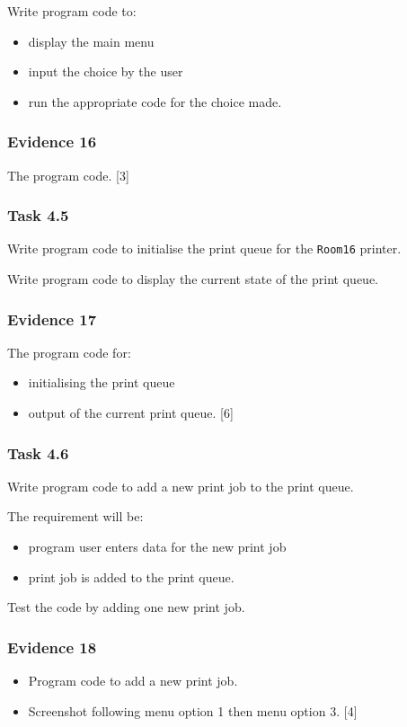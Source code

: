 Write program code to: 
\begin{itemize}
\item display the main menu 
\item input the choice by the user 
\item run the appropriate code for the choice made.
\end{itemize}

\subsubsection*{Evidence 16}

The program code. \hfill{}{[}3{]}

\subsubsection*{Task 4.5}

Write program code to initialise the print queue for the \texttt{Room16}
printer. 

Write program code to display the current state of the print queue.

\subsubsection*{Evidence 17}

The program code for:
\begin{itemize}
\item initialising the print queue
\item output of the current print queue. \hfill{}{[}6{]}
\end{itemize}

\subsubsection*{Task 4.6}

Write program code to add a new print job to the print queue.

The requirement will be:
\begin{itemize}
\item program user enters data for the new print job
\item print job is added to the print queue.
\end{itemize}
Test the code by adding one new print job.

\subsubsection*{Evidence 18}
\begin{itemize}
\item Program code to add a new print job.
\item Screenshot following menu option 1 then menu option 3. \hfill{}{[}4{]}
\end{itemize}


